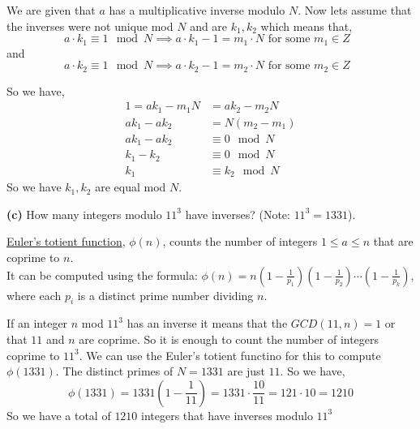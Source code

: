 \documentclass[12pt]{article}
\newcommand{\question}[3][Q]{
\begin{description}
\item \textbf{#1{#2}} #3
\end{description}
}
\newcommand{\hint}[1]{{\footnotesize
    \begin{description}
    [leftmargin=3.3em,style=nextline]
        \item[Hint:] {#1}
    \end{description}}   
}
\begin{document}
\begin{answer}
    We are given that $a $ has a multiplicative inverse modulo $N$. Now lets assume that the inverses were not unique mod $N$ and are $k_1,k_2$ which means that, 
    $$ a \cdot k_1 \equiv 1 \mod N  \implies a\cdot k_1 - 1 = m_1\cdot N \text{ for some $m_1 \in Z$ }$$  and  
    $$ a \cdot k_2 \equiv 1 \mod N  \implies a\cdot k_2 - 1 = m_2\cdot N \text{ for some $m_2 \in Z$ }$$  

    So we have, 
    \begin{align*}
        1 = ak_1 - m_1N &= ak_2 - m_2N\\
        ak_1 - ak_2 &= N(m_2-m_1)\\
        ak_1 -ak_2 &\equiv 0 \mod N\\
        k_1 -k_2 &\equiv 0 \mod N\\
        k_1 &\equiv k_2  \mod N
    \end{align*}
    So we have $k_1,k_2$ are equal mod $N$.

\end{answer}


\question[]{(c)}{
    How many integers modulo $11^3$ have inverses? (Note: $11^3 = 1331$).

    \hint{\href{https://en.wikipedia.org/wiki/Euler\%27s_totient_function}{Euler's totient function}, $\phi(n)$, counts the number of integers $1 \leq a \leq n$ that are coprime to $n$. \\
    It can be computed using the formula:
    $\phi(n) = n \left( 1 - \frac{1}{p_1} \right) \left( 1 - \frac{1}{p_2} \right) \cdots \left( 1 - \frac{1}{p_k} \right)$, where each $p_i$ is a distinct prime number dividing $n$.}
}

\begin{answer}
    If an integer $n$ mod $11^{3}$ has an inverse it means that the $GCD(11,n) = 1$ or that $11$ and $n$ are coprime. So it is enough to count the number of integers coprime to $11^{3}$. We can use the Euler's totient functino for this to compute $\phi(1331)$. The distinct primes of $N = 1331$ are just $11$. So we have,  
    $$ \phi(1331) = 1331(1 - \frac{1}{11}) = 1331 \cdot \frac{10}{11} = 121 \cdot 10 = 1210 $$ 
    So we have a total of $1210$ integers that have inverses modulo $11^{3}$

\end{answer}

\newpage
\end{document}
